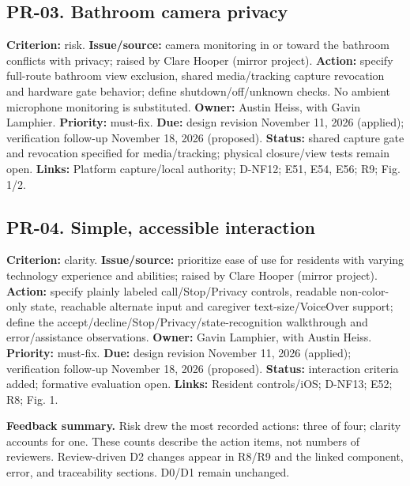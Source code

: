 \documentclass[12pt,letterpaper]{article}
\begin{document}
\begin{minipage}{\linewidth}
\subsection*{PR-03. Bathroom camera privacy}
\textbf{Criterion:} risk. \textbf{Issue/source:} camera monitoring in or toward the bathroom conflicts with privacy; raised by Clare Hooper (mirror project). \textbf{Action:} specify full-route bathroom view exclusion, shared media/tracking capture revocation and hardware gate behavior; define shutdown/off/unknown checks. No ambient microphone monitoring is substituted. \textbf{Owner:} Austin Heiss, with Gavin Lamphier. \textbf{Priority:} must-fix. \textbf{Due:} design revision November 11, 2026 (applied); verification follow-up November 18, 2026 (proposed). \textbf{Status:} shared capture gate and revocation specified for media/tracking; physical closure/view tests remain open. \textbf{Links:} Platform capture/local authority; D-NF12; E51, E54, E56; R9; Fig. 1/2.
\end{minipage}\par\medskip

\begin{minipage}{\linewidth}
\subsection*{PR-04. Simple, accessible interaction}
\textbf{Criterion:} clarity. \textbf{Issue/source:} prioritize ease of use for residents with varying technology experience and abilities; raised by Clare Hooper (mirror project). \textbf{Action:} specify plainly labeled call/Stop/Privacy controls, readable non-color-only state, reachable alternate input and caregiver text-size/VoiceOver support; define the accept/decline/Stop/Privacy/state-recognition walkthrough and error/assistance observations. \textbf{Owner:} Gavin Lamphier, with Austin Heiss. \textbf{Priority:} must-fix. \textbf{Due:} design revision November 11, 2026 (applied); verification follow-up November 18, 2026 (proposed). \textbf{Status:} interaction criteria added; formative evaluation open. \textbf{Links:} Resident controls/iOS; D-NF13; E52; R8; Fig. 1.
\end{minipage}\par\medskip

\textbf{Feedback summary.} Risk drew the most recorded actions: three of four; clarity accounts for one. These counts describe the action items, not numbers of reviewers. Review-driven D2 changes appear in R8/R9 and the linked component, error, and traceability sections. D0/D1 remain unchanged.
\end{document}

